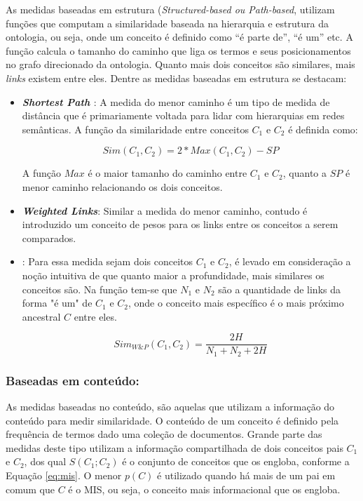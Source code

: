 As medidas baseadas em estrutura (\textit{Structured-based ou Path-based}, utilizam funções que computam a similaridade baseada na hierarquia e estrutura da ontologia, ou seja, onde um conceito é definido como “é parte de”, “é um” etc. A função calcula o tamanho do caminho que liga os termos e seus posicionamentos no grafo direcionado da ontologia. Quanto mais dois conceitos são similares, mais \textit{links} existem entre eles. Dentre as medidas baseadas em estrutura se destacam:

\begin{itemize}
	\item{\textbf{\textit{Shortest Path} \citep{Rada:1989}}: A medida do menor caminho é um tipo de medida de distância que é primariamente voltada para lidar com hierarquias em redes semânticas. A função da similaridade entre conceitos $C_1$ e $C_2$ é definida como:

	\begin{equation}
		Sim(C_1, C_2) = 2 * Max(C_1, C_2) - SP	
	\label{eq:shortest_path}
	\end{equation}
	
	A função $Max$ é o maior tamanho do caminho entre $C_1$ e $C_2$, quanto a $SP$ é menor caminho relacionando os dois conceitos.}
	
	\item{\textbf{\textit{Weighted Links}}: Similar a medida do menor caminho, contudo é introduzido um conceito de pesos para os links entre os conceitos a serem comparados.}
	
	\item{\textbf{\cite{Wu:1994}}: Para essa medida sejam dois conceitos $C_1$ e $C_2$, é levado em consideração a noção intuitiva de que quanto maior a profundidade, mais similares os conceitos são. Na função tem-se que $N_1$ e $N_2$ são a quantidade de links da forma "é um" de $C_1$ e $C_2$, onde o conceito mais específico é o mais próximo ancestral  $C$ entre eles. 

	\begin{equation}
		Sim_{W \& P}(C_1, C_2) = \frac{2H}{N_1 + N_2 + 2H}	
	\label{eq:wu_palmer}
	\end{equation}	}	
\end{itemize}

\subsubsection{Baseadas em conteúdo:}

As medidas baseadas no conteúdo, são aquelas que utilizam a informação do conteúdo para medir similaridade. O conteúdo de um conceito é definido pela frequência de termos dado uma coleção de documentos. Grande parte das medidas deste tipo utilizam a informação compartilhada de dois conceitos pais $C_1$ e $C_2$, dos qual $S(C_1; C_2)$ é o conjunto de conceitos que os engloba, conforme a Equação \ref{eq:mis}.  O menor $p(C)$ é utilizado quando há mais de um pai em comum que $C$ é o \ac{MIS}, ou seja, o conceito mais informacional que os engloba.

